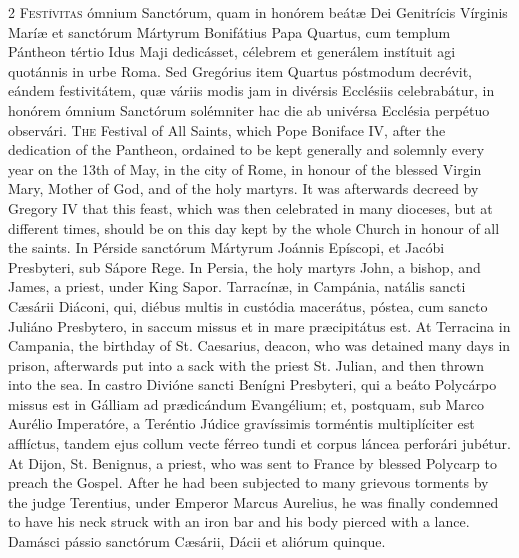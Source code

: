 \begin{paracol}{2}
\lettrine[lines=2]{F}{estívitas} ómnium 
 Sanctórum, quam in honórem beátæ Dei Genitrícis Vírginis Maríæ et sanctórum 
 Mártyrum Bonifátius Papa Quartus, cum templum Pántheon tértio Idus Maji 
 dedicásset, célebrem et generálem instítuit agi quotánnis in urbe Roma. 
 Sed Gregórius item Quartus póstmodum decrévit, eándem festivitátem, quæ 
 váriis modis jam in divérsis Ecclésiis celebrabátur, in honórem ómnium 
 Sanctórum solémniter hac die ab univérsa Ecclésia perpétuo observári.
\switchcolumn
{}
\lettrine[lines=2]{T}{he} Festival of All Saints, which Pope Boniface IV, after the dedication 
 of the Pantheon, ordained to be kept generally and solemnly every year on 
 the 13th of May, in the city of Rome, in honour of the blessed Virgin Mary, 
 Mother of God, and of the holy martyrs. It was afterwards decreed by 
 Gregory IV that this feast, which was then celebrated in many dioceses, but 
 at different times, should be on this day kept by the whole Church in honour 
 of all the saints.
\switchcolumn*
{}
In Pérside sanctórum 
 Mártyrum Joánnis Epíscopi, et Jacóbi Presbyteri, sub Sápore Rege.
\switchcolumn
{}
In Persia, the holy martyrs John, a 
 bishop, and James, a priest, under King Sapor.
\switchcolumn*
{}
Tarracínæ, in Campánia, natális sancti Cæsárii Diáconi, qui, diébus multis in custódia macerátus, 
 póstea, cum sancto Juliáno Presbytero, in saccum missus et in mare 
 præcipitátus est.
\switchcolumn
{}
At Terracina in Campania, the 
 birthday of St. Caesarius, deacon, who was detained many days in prison, 
 afterwards put into a sack with the priest St. Julian, and then thrown into 
 the sea.
\switchcolumn*
{}
In castro Divióne 
 sancti Benígni Presbyteri, qui a beáto Polycárpo missus est in Gálliam ad 
 prædicándum Evangélium; et, postquam, sub Marco Aurélio Imperatóre, a 
 Teréntio Júdice gravíssimis torméntis multiplíciter est afflíctus, tandem 
 ejus collum vecte férreo tundi et corpus láncea perforári jubétur.
\switchcolumn
{}
At Dijon, St. Benignus, a priest, 
 who was sent to France by blessed Polycarp to preach the Gospel. After 
 he had been subjected to many grievous torments by the judge Terentius, 
 under Emperor Marcus Aurelius, he was finally condemned to have his neck 
 struck with an iron bar and his body pierced with a lance.
\switchcolumn*
{}
Damásci pássio 
 sanctórum Cæsárii, Dácii et aliórum quinque.

\end{paracol}
